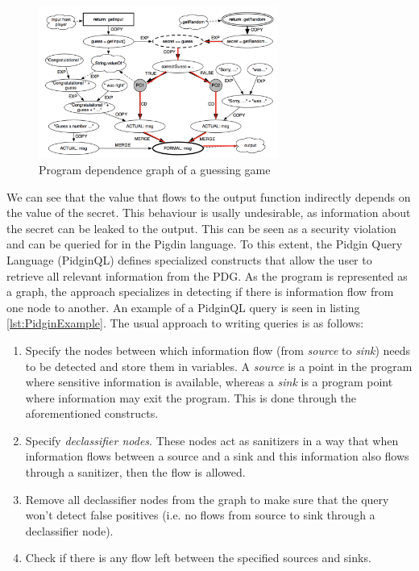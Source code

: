 \begin{figure}[!ht]
    \centering
      \includegraphics[width=0.7\textwidth]{images/PDG} 
      \caption{Program dependence graph of a guessing game}
    \label{fig:PDG}
\end{figure}

We can see that the value that flows to the output function indirectly depends on the value of the secret. This behaviour is usally undesirable, as information about the secret can be leaked to the output. This can be seen as a security violation and can be queried for in the Pigdin language. To this extent, the Pidgin Query Language (PidginQL) defines specialized constructs that allow the user to retrieve all relevant information from the PDG. As the program is represented as a graph, the approach specializes in detecting if there is information flow from one node to another. An example of a PidginQL query is seen in listing \ref{lst:PidginExample}. The usual approach to writing queries is as follows: 

\begin{enumerate}
\item Specify the nodes between which information flow (from \textit{source} to \textit{sink}) needs to be detected and store them in variables. A \textit{source} is a point in the program where sensitive information is available, whereas a \textit{sink} is a program point where information may exit the program. This is done through the aforementioned constructs.
\item Specify \textit{declassifier nodes}. These nodes act as sanitizers in a way that when information flows between a source and a sink and this information also flows through a sanitizer, then the flow is allowed.
\item Remove all declassifier nodes from the graph to make sure that the query won't detect false positives (i.e. no flows from source to sink through a declassifier node).
\item Check if there is any flow left between the specified sources and sinks.
\end{enumerate}

